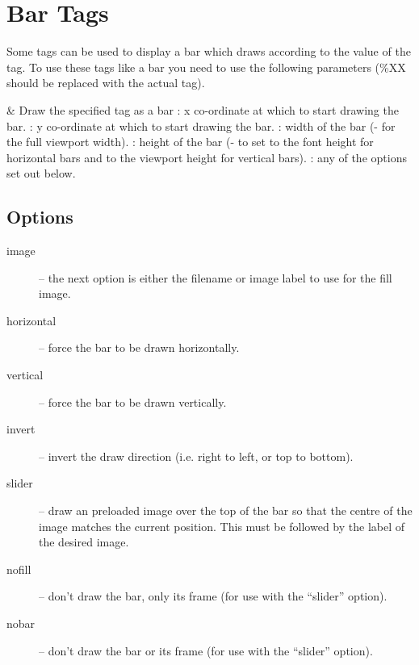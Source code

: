 \section{\label{ref:bar_tags}Bar Tags}
  Some tags can be used to display a bar which draws according to the value of
  the tag. To use these tags like a bar you need to use the following parameters
  (\%XX should be replaced with the actual tag).

\begin{tagmap}
    & Draw the specified tag as a bar\newline
      : x co-ordinate at which to start drawing the bar.\newline
      : y co-ordinate at which to start drawing the bar.\newline
      : width of the bar (- for the full viewport width).\newline
      : height of the bar (- to set to the font height for
        horizontal bars and to the viewport height for vertical bars).\newline
      : any of the options set out below.\\
\end{tagmap}

\subsection{Options}
\begin{description}
  \item[image] -- the next option is either the filename or image label to
    use for the fill image.
  \item[horizontal] -- force the bar to be drawn horizontally.
  \item[vertical] -- force the bar to be drawn vertically.
  \item[invert] -- invert the draw direction (i.e. right to left, or top to
    bottom).
  \item[slider] -- draw an preloaded image over the top of the bar so that
    the centre of the image matches the current position. This must be
    followed by the label of the desired image.
  \item[nofill] -- don't draw the bar, only its frame (for use with the
     ``slider'' option).
  \item[nobar] -- don't draw the bar or its frame (for use with the
    ``slider'' option).
\end{description}

